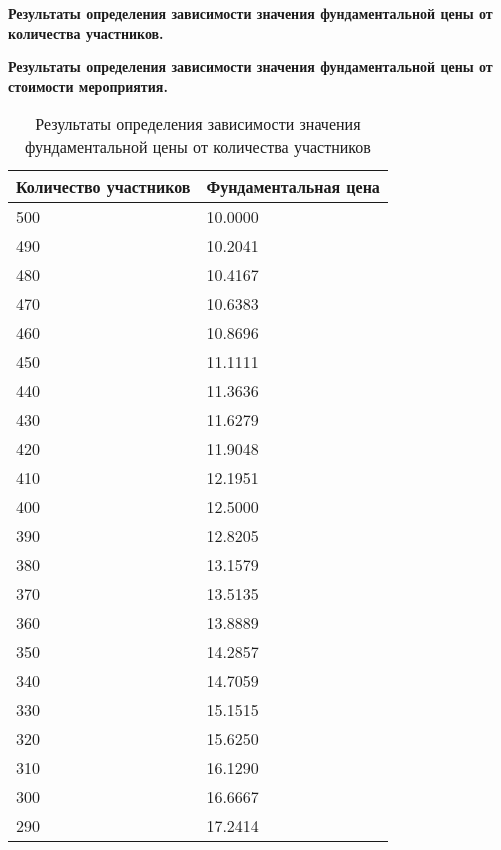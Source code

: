 
\textbf{Результаты определения зависимости значения фундаментальной цены от количества участников.}

\textbf{Результаты определения зависимости значения фундаментальной цены от стоимости мероприятия.}

\newpage

\pagestyle{empty}

\setcounter{table}{0}

\renewcommand{\thetable}{Б.\arabic{table}}

\begin{table}[H]
	\centering
	\caption{Результаты определения зависимости значения фундаментальной цены от количества участников}
	\label{tbl:dependence-1}
	\begin{tabularx}{\textwidth}{|X|X|}
		\hline
		\textbf{Количество участников} & \textbf{Фундаментальная цена} \\
		\hline
		500  & 10.0000         \\ \hline
		490  & 10.2041         \\ \hline
		480  & 10.4167         \\ \hline
		470  & 10.6383         \\ \hline
		460  & 10.8696         \\ \hline
		450  & 11.1111         \\ \hline
		440  & 11.3636         \\ \hline
		430  & 11.6279         \\ \hline
		420  & 11.9048         \\ \hline
		410  & 12.1951         \\ \hline
		400  & 12.5000         \\ \hline
		390  & 12.8205         \\ \hline
		380  & 13.1579         \\ \hline
		370  & 13.5135         \\ \hline
		360  & 13.8889         \\ \hline
		350  & 14.2857         \\ \hline
		340  & 14.7059         \\ \hline
		330  & 15.1515         \\ \hline
		320  & 15.6250         \\ \hline
		310  & 16.1290         \\ \hline
		300  & 16.6667         \\ \hline
		290  & 17.2414         \\ \hline

\end{tabularx}
\end{table}
